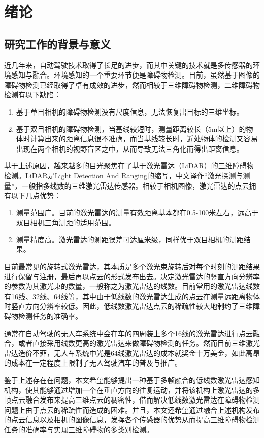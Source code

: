 
\chapter{绪论}
\section{研究工作的背景与意义}
近几年来，自动驾驶技术取得了长足的进步，而其中关键的技术就是多传感器的环境感知与融合。环境感知的一个重要环节便是障碍物检测。目前，虽然基于图像的障碍物检测已经取得了卓有成效的进步，然而相较于三维障碍物检测，二维障碍物检测有以下缺陷：
\begin{enumerate}
    \item 基于单目相机的障碍物检测没有尺度信息，无法恢复出目标的三维坐标。
    \item 基于双目相机的障碍物检测，当基线较短时，测量距离较长（5m以上）的物体时计算出来的距离信息很不准确，而当基线较长时，近处物体的检测又容易出现在两个相机的视野盲区之中，从而导致无法三角化而得出距离信息。
\end{enumerate}
基于上述原因，越来越多的目光聚焦在了基于激光雷达（LiDAR）的三维障碍物检测。LiDAR是Light Detection And Ranging的缩写，中文译作“激光探测与测量”，一般指多线数的三维激光雷达传感器。相较于相机图像，激光雷达的点云拥有以下几点优势：
\begin{enumerate}
    \item 测量范围广。目前的激光雷达的测量有效距离基本都在0.5-100米左右，远高于双目相机三角测距的适用范围。
    \item 测量精度高。激光雷达的测距误差可达厘米级，同样优于双目相机的测距结果。
\end{enumerate}
目前最常见的旋转式激光雷达，其本质是多个激光束旋转后对每个时刻的测距结果进行保留与注册，最后再以点云的形式发布出去。决定激光雷达的竖直方向分辨率的参数为其激光束的数量，一般称之为激光雷达的线数。目前常用的激光雷达线数有16线、32线、64线等，其中由于低线数的激光雷达生成的点云在测量远距离物体时竖直方向分辨率较低。因此，低线数激光雷达点云的稀疏性较大地制约了三维障碍物检测任务的准确率。

通常在自动驾驶的无人车系统中会在车的四周装上多个16线的激光雷达进行点云融合，或者直接采用线数更高的激光雷达来做障碍物检测的任务。然而目前三维激光雷达造价不菲，无人车系统中光是64线激光雷达的成本就奖金十万美金，如此高昂的成本在一定程度上限制了无人驾驶汽车的普及与推广。

鉴于上述存在在问题，本文希望能够提出一种基于多帧融合的低线数激光雷达感知机构，使其能够通过增加一个在垂直方向的往复运动，并将该机构上激光雷达的多帧点云融合发布来提高三维点云的稠密性，借而解决低线数激光雷达在障碍物检测问题上由于点云的稀疏性而造成的困难。并且，本文还希望通过融合上述机构发布的点云信息以及相机的图像信息，发挥各个传感器的优势从而提高三维障碍物检测任务的准确率与实现三维障碍物的多类别检测。

